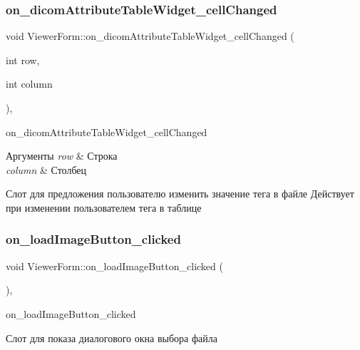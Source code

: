 \subsubsection{\texorpdfstring{on\+\_\+dicom\+Attribute\+Table\+Widget\+\_\+cell\+Changed}{on\_dicomAttributeTableWidget\_cellChanged}}
{\footnotesize\ttfamily void Viewer\+Form\+::on\+\_\+dicom\+Attribute\+Table\+Widget\+\_\+cell\+Changed (\begin{DoxyParamCaption}\item[{int}]{row,  }\item[{int}]{column }\end{DoxyParamCaption})\hspace{0.3cm}{\ttfamily [private]}, {\ttfamily [slot]}}



on\+\_\+dicom\+Attribute\+Table\+Widget\+\_\+cell\+Changed 


\begin{DoxyParams}{Аргументы}
{\em row} & Строка \\
\hline
{\em column} & Столбец\\
\hline
\end{DoxyParams}
Слот для предложения пользователю изменить значение тега в файле Действует при изменении пользователем тега в таблице \mbox{\label{classViewerForm_aebe4c92a2d951281558a7074347a7ec7}} 
\subsubsection{\texorpdfstring{on\+\_\+load\+Image\+Button\+\_\+clicked}{on\_loadImageButton\_clicked}}
{\footnotesize\ttfamily void Viewer\+Form\+::on\+\_\+load\+Image\+Button\+\_\+clicked (\begin{DoxyParamCaption}{ }\end{DoxyParamCaption})\hspace{0.3cm}{\ttfamily [private]}, {\ttfamily [slot]}}



on\+\_\+load\+Image\+Button\+\_\+clicked 

Слот для показа диалогового окна выбора файла \mbox{\label{classViewerForm_a5d3adb46be46748d665e38e47decdf2c}} 
